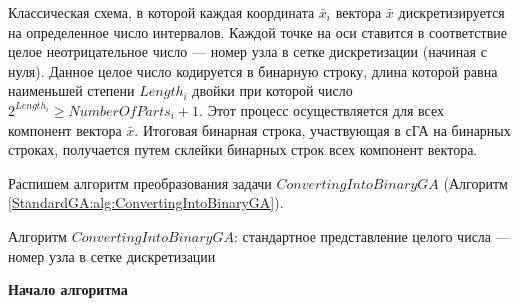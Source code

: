 Классическая схема, в которой каждая координата $ \bar{x}_i $ вектора $ \bar{x} $ дискретизируется на определенное число интервалов. Каждой точке на оси ставится в соответствие целое неотрицательное число --- номер узла в сетке дискретизации (начиная с нуля). Данное целое число кодируется в бинарную строку, длина которой равна наименьшей степени $ Length_i $ двойки  при которой число $ 2^{Length_i}\geq NumberOfParts_i+1 $. Этот процесс осуществляется для всех компонент вектора $ \bar{x} $. Итоговая бинарная строка, участвующая в сГА на бинарных строках, получается путем склейки бинарных строк всех компонент вектора.

Распишем алгоритм преобразования задачи $ ConvertingIntoBinaryGA $ (Алгоритм  \ref{StandardGA:alg:ConvertingIntoBinaryGA}).

\begin{algorithm}
\caption{Алгоритм $ ConvertingIntoBinaryGA $: стандартное представление целого числа --- номер узла в сетке дискретизации}\label{StandardGA:alg:ConvertingIntoBinaryGA}
\begin{algorithmic}

\State \textbf{Начало алгоритма}


\end{algorithmic}
\end{algorithm}
